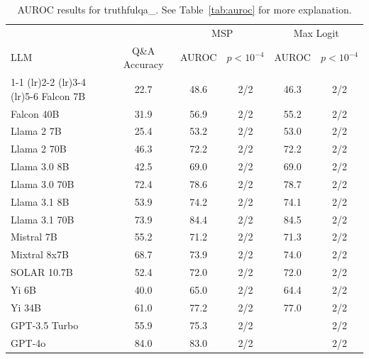 \begin{table}[h]
\caption{AUROC results for truthfulqa_. See Table~\ref{tab:auroc} for more explanation.}
\label{tab:auroc_margin}
\centering
\begin{tabular}{lccccc}
\toprule
& & \multicolumn{2}{c}{MSP} & \multicolumn{2}{c}{Max Logit} \\ 
LLM & Q\&A Accuracy & AUROC & $p < 10^{-4}$ & AUROC & $p < 10^{-4}$ \\ 
\cmidrule(lr){1-1} \cmidrule(lr){2-2} \cmidrule(lr){3-4} \cmidrule(lr){5-6} 
Falcon 7B & 22.7 & 48.6 & 2/2 & 46.3 & 2/2\\
Falcon 40B & 31.9 & 56.9 & 2/2 & 55.2 & 2/2\\
Llama 2 7B & 25.4 & 53.2 & 2/2 & 53.0 & 2/2\\
Llama 2 70B & 46.3 & 72.2 & 2/2 & 72.2 & 2/2\\
Llama 3.0 8B & 42.5 & 69.0 & 2/2 & 69.0 & 2/2\\
Llama 3.0 70B & 72.4 & 78.6 & 2/2 & 78.7 & 2/2\\
Llama 3.1 8B & 53.9 & 74.2 & 2/2 & 74.1 & 2/2\\
Llama 3.1 70B & 73.9 & 84.4 & 2/2 & 84.5 & 2/2\\
Mistral 7B & 55.2 & 71.2 & 2/2 & 71.3 & 2/2\\
Mixtral 8x7B & 68.7 & 73.9 & 2/2 & 74.0 & 2/2\\
SOLAR 10.7B & 52.4 & 72.0 & 2/2 & 72.0 & 2/2\\
Yi 6B & 40.0 & 65.0 & 2/2 & 64.4 & 2/2\\
Yi 34B & 61.0 & 77.2 & 2/2 & 77.0 & 2/2\\
GPT-3.5 Turbo & 55.9 & 75.3 & 2/2 &  & 2/2\\
GPT-4o & 84.0 & 83.0 & 2/2 &  & 2/2\\
\bottomrule
\end{tabular}
\end{table}

